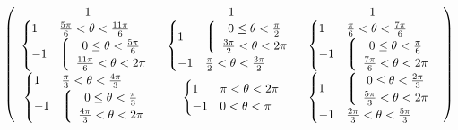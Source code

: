 \begin{equation}
\left(
\begin{array}{ccc}
1
 &
1
 &
1
 \\
\begin{cases}
   1 & \frac{5 \pi }{6}<\theta <\frac{11 \pi }{6} \\
 -1 & \left\lgroup \begin{array}{c} 0\leq \theta <\frac{5 \pi }{6} \\ \frac{11 \pi }{6}<\theta <2 \pi  \end{array} \right.\\
\end{cases}
 &
\begin{cases}
 1   & \left\lgroup \begin{array}{c} 0\leq \theta <\frac{\pi }{2} \\ \frac{3 \pi }{2}<\theta <2 \pi  \end{array} \right.\\
 -1 & \frac{\pi }{2}<\theta <\frac{3 \pi }{2} \\
\end{cases}
 &
\begin{cases}
 1 & \frac{\pi }{6}<\theta <\frac{7 \pi }{6} \\
 -1 & \left\lgroup \begin{array}{c}  0\leq \theta <\frac{\pi }{6} \\ \frac{7 \pi }{6}<\theta <2 \pi  \end{array} \right.\\
\end{cases}
 \\

\begin{cases}
 1 & \frac{\pi }{3}<\theta <\frac{4 \pi }{3} \\
 -1 & \left\lgroup \begin{array}{c} 0 \leq \theta <\frac{\pi }{3} \\ \frac{4 \pi }{3}<\theta <2 \pi \end{array} \right. \\
\end{cases}
 &
\begin{cases}
 1 & \pi <\theta <2 \pi  \\
 -1 & 0<\theta <\pi  \\
\end{cases}
 &
\begin{cases}
   1 & \left\lgroup \begin{array}{c} 0\leq \theta <\frac{2 \pi }{3} \\ \frac{5 \pi }{3}<\theta <2 \pi  \end{array} \right.\\
 -1 & \frac{2 \pi }{3}<\theta <\frac{5 \pi }{3} \\
\end{cases}
 \\
\end{array}
\right)
\end{equation}

